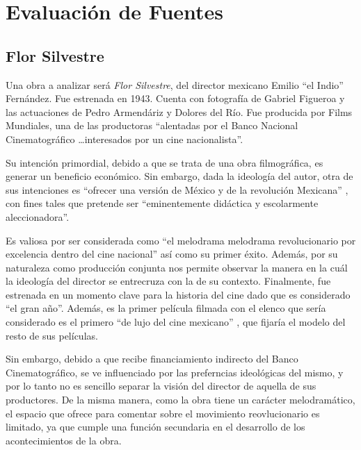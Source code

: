 \section{Evaluación de Fuentes}
\subsection{Flor Silvestre}
Una obra a analizar será \textit{Flor Silvestre}, del director mexicano Emilio ``el Indio'' Fernández. 
Fue estrenada en 1943. Cuenta con fotografía de Gabriel Figueroa y las actuaciones de Pedro Armendáriz y Dolores del Río. Fue producida por Films Mundiales, una de las productoras ``alentadas por el Banco Nacional Cinematográfico \ldots interesados por un cine nacionalista''. %

Su intención primordial, debido a que se trata de una obra filmográfica, es generar un beneficio económico.
Sin embargo, dada la ideología del autor, otra de sus intenciones es ``ofrecer una versión de México y de la revolución Mexicana''%
, con fines tales que pretende ser ``eminentemente didáctica y escolarmente aleccionadora''. %

Es valiosa por ser considerada como ``el melodrama melodrama revolucionario por excelencia dentro del cine
nacional'' %
así como su primer éxito. %
Además, por su naturaleza como producción conjunta nos permite observar la manera en la cuál la ideología del director se entrecruza con la de su contexto. 
Finalmente, fue estrenada en un momento clave para la historia del cine dado que es considerado ``el gran año''. %
Además, es la primer película filmada con el elenco que sería considerado es el primero ``de lujo del cine mexicano''%
, que fijaría el modelo del resto de sus películas.%

Sin embargo, debido a que recibe financiamiento indirecto del Banco Cinematográfico, %
se ve influenciado por las preferncias ideológicas del mismo, y por lo tanto no es sencillo separar la visión del director de aquella de sus productores. 
De la misma manera, como la obra tiene un carácter melodramático, el espacio que ofrece para comentar sobre el movimiento reovlucionario es limitado, ya que cumple una función secundaria en el desarrollo de los acontecimientos de la obra.%
 

